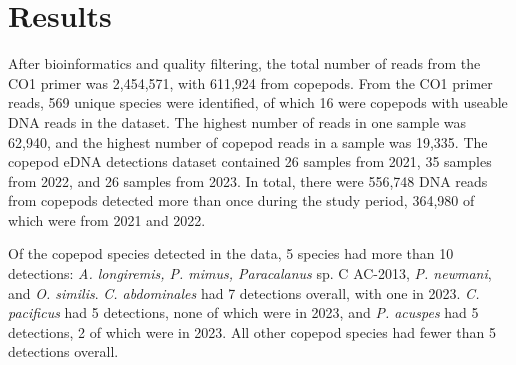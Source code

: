 \documentclass[12pt,twoside]{reedthesis}
\begin{document}

	\chapter{Results}
	
	
	After bioinformatics and quality filtering, the total number of reads from the CO1 primer was 2,454,571, with 611,924 from copepods. From the CO1 primer reads, 569 unique species were identified, of which 16 were copepods with useable DNA reads in the dataset. The highest number of reads in one sample was 62,940, and the highest number of copepod reads in a sample was 19,335. The copepod eDNA detections dataset contained 26 samples from 2021, 35 samples from 2022, and 26 samples from 2023. In total, there were 556,748 DNA reads from copepods detected more than once during the study period, 364,980 of which were from 2021 and 2022. 
	
	Of the copepod species detected in the data, 5 species had more than 10 detections: \textit{A. longiremis, P. mimus, Paracalanus} sp. C AC-2013, \textit{P. newmani}, and \textit{O. similis}. \textit{C. abdominales} had 7 detections overall, with one in 2023. \textit{C. pacificus} had 5 detections, none of which were in 2023, and \textit{P. acuspes} had 5 detections, 2 of which were in 2023. All other copepod species had fewer than 5 detections overall.
	
	
	
\end{document}
